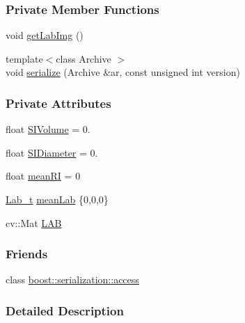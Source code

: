 \subsubsection*{Private Member Functions}
\begin{DoxyCompactItemize}
\item 
void \hyperlink{class_soil_analyzer_1_1_particle_af16a0440848d38b85306d470d6e32c6e}{get\+Lab\+Img} ()
\item 
{\footnotesize template$<$class Archive $>$ }\\void \hyperlink{class_soil_analyzer_1_1_particle_adf8333262eab916769156f8c324e5a28}{serialize} (Archive \&ar, const unsigned int version)
\end{DoxyCompactItemize}
\subsubsection*{Private Attributes}
\begin{DoxyCompactItemize}
\item 
float \hyperlink{class_soil_analyzer_1_1_particle_a62edcdac484d0822a098ac58b9927150}{S\+I\+Volume} = 0.
\item 
float \hyperlink{class_soil_analyzer_1_1_particle_a43f6f6107ddd2987f8c7a1ef25ffedaa}{S\+I\+Diameter} = 0.
\item 
float \hyperlink{class_soil_analyzer_1_1_particle_a872cff805a22cab5a04b76c58f9f1584}{mean\+R\+I} = 0
\item 
\hyperlink{struct_soil_analyzer_1_1_lab__t}{Lab\+\_\+t} \hyperlink{class_soil_analyzer_1_1_particle_a29dfce4053a62ae088e7220dea1954d9}{mean\+Lab} \{0,0,0\}
\item 
cv\+::\+Mat \hyperlink{class_soil_analyzer_1_1_particle_a57e00853b68506aaaa000e78316d84a1}{L\+A\+B}
\end{DoxyCompactItemize}
\subsubsection*{Friends}
\begin{DoxyCompactItemize}
\item 
class \hyperlink{class_soil_analyzer_1_1_particle_ac98d07dd8f7b70e16ccb9a01abf56b9c}{boost\+::serialization\+::access}
\end{DoxyCompactItemize}


\subsubsection{Detailed Description}


